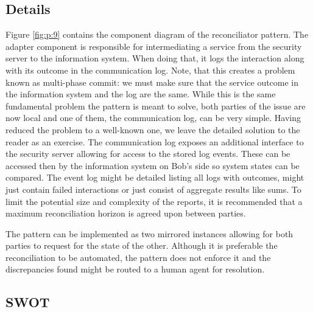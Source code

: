 \documentclass[10pt,a4paper]{article}
\begin{document}
\subsection{Details}
Figure \ref{fig:p:9} contains the component diagram of the reconciliator pattern. The adapter component is responsible for intermediating a service from the security server to the information system. When doing that, it logs the interaction along with its outcome in the communication log. Note, that this creates a problem known as multi-phase commit: we must make sure that the service outcome in the information system and the log are the same. While this is the same fundamental problem the pattern is meant to solve, both parties of the issue are now local and one of them, the communication log, can be very simple. Having reduced the problem to a well-known one, we leave the detailed solution to the reader as an exercise. The communication log exposes an additional interface to the security server allowing for access to the stored log events. These can be accessed then by the information system on Bob's side so system states can be compared. The event log might be detailed listing all logs with outcomes, might just contain failed interactions or just consist of aggregate results like sums. To limit the potential size and complexity of the reports, it is recommended that a maximum reconciliation horizon is agreed upon between parties.

The pattern can be implemented as two mirrored instances allowing for both parties to request for the state of the other. Although it is preferable the reconciliation to be automated, the pattern does not enforce it and the discrepancies found might be routed to a human agent for resolution.

\subsection{SWOT}
\end{document}
